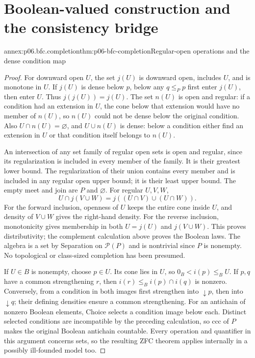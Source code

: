 \section{Boolean-valued construction and the consistency bridge}
\label{sec:annex-p06-boolean-forcing-consistency}

\begin{annexitem}{annex:p06.bfc.completion}{thm:p06-bfc-completion}{Regular-open operations and the dense condition map}
\begin{proof}
For downward open \(U\), the set \(j(U)\) is downward open, includes
\(U\), and is monotone in \(U\). If \(j(U)\) is dense below \(p\),
below any \(q\leq_P p\) first enter \(j(U)\), then enter \(U\).
Thus \(j(j(U))=j(U)\). The set \(n(U)\) is open and regular:
if a condition had an extension in \(U\), the cone below that extension
would have no member of \(n(U)\), so \(n(U)\) could not be dense
below the original condition. Also \(U\cap n(U)=\varnothing\), and
\(U\cup n(U)\) is dense: below a condition either find an extension
in \(U\) or that condition itself belongs to \(n(U)\).

An intersection of any set family of regular open sets is open and
regular, since its regularization is included in every member of the
family. It is their greatest lower bound. The regularization of their
union contains every member and is included in any regular open upper
bound; it is their least upper bound. The empty meet and join are
\(P\) and \(\varnothing\). For regular \(U,V,W\),
\[
 U\cap j(V\cup W)=j((U\cap V)\cup(U\cap W)).
\]
For the forward inclusion, openness of \(U\) keeps the entire cone
inside \(U\), and density of \(V\cup W\) gives the right-hand density.
For the reverse inclusion, monotonicity gives membership in both
\(U=j(U)\) and \(j(V\cup W)\). This proves distributivity; the
complement calculation above proves the Boolean laws. The algebra is
a set by Separation on \(\mathcal P(P)\) and is nontrivial since \(P\)
is nonempty. No topological or class-sized completion has been presumed.

If \(U\in B\) is nonempty, choose \(p\in U\). Its cone lies in \(U\),
so \(0_B<i(p)\leq_B U\). If \(p,q\) have a common strengthening
\(r\), then \(i(r)\leq_B i(p)\cap i(q)\) is nonzero. Conversely,
from a condition in both images first strengthen into \(\downarrow p\),
then into \(\downarrow q\); their defining densities ensure a common
strengthening. For an antichain of nonzero Boolean elements, Choice
selects a condition image below each. Distinct selected conditions are
incompatible by the preceding calculation, so ccc of \(P\) makes the
original Boolean antichain countable. Every operation and quantifier in
this argument concerns sets, so the resulting ZFC theorem applies
internally in a possibly ill-founded model too.
\end{proof}
\end{annexitem}

